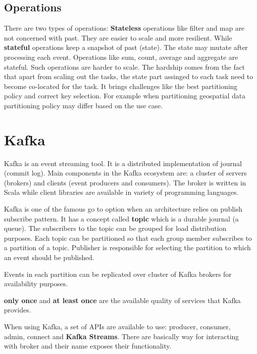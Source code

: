 \documentclass[a4]{report}
\begin{document}
    \subsection{Operations}
    There are two types of operations:
    \textbf{Stateless} operations like filter and map are not concerned with past.
    They are easier to scale and more resilient.
    While \textbf{stateful} operations keep a snapshot of past (state).
    The state may mutate after processing each event.
    Operations like sum, count, average and aggregate are stateful.
    Such operations are harder to scale.
    The hardship comes from the fact that apart from scaling out the tasks, the state part assinged to each task need
    to become co-located for the task.
    It brings challenges like the best partitioning policy and correct key selection.
    For example when partitioning geospatial data partitioning policy may differ based on the use case.

    \section{Kafka}
    Kafka\cite{kafka} is an event streaming tool.
    It is a distributed implementation of journal (commit log).
    Main components in the Kafka ecosystem are: a cluster of servers (brokers) and clients (event producers and consumers).
    The broker is written in Scala while client libraries are available in variety of programming languages.

    Kafka is one of the famous go to option when an architecture relies on publish subscribe pattern.
    It has a concept called \textbf{topic} which is a durable journal (a queue).
    The subscribers to the topic can be grouped for load distribution purposes.
    Each topic can be partitioned so that each group member subscribes to a partition of a topic.
    Publisher is responsible for selecting the partition to which an event should be published.

    Events in each partition can be replicated over cluster of Kafka brokers for availability purposes.

    \textbf{only once} and \textbf{at least once} are the available quality of services that Kafka provides.

    When using Kafka, a set of APIs are available to use: producer, consumer, admin, connect and \textbf{Kafka Streams}.
    There are basically way for interacting with broker and their name exposes their functionality.
\end{document}
